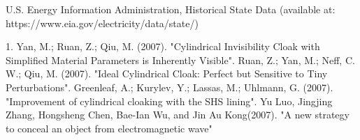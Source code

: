 \documentclass[letterpaper, 12 pt]{article}  %
\begin{document}
\begin{thebibliography}{99}
 U.S. Energy Information Administration, Historical State Data (available at: https://www.eia.gov/electricity/data/state/)

 1.	 Yan, M.; Ruan, Z.; Qiu, M. (2007). "Cylindrical Invisibility Cloak with Simplified Material Parameters is Inherently Visible".
 Ruan, Z.; Yan, M.; Neff, C. W.; Qiu, M. (2007). "Ideal Cylindrical Cloak: Perfect but Sensitive to Tiny Perturbations". 
Greenleaf, A.; Kurylev, Y.; Lassas, M.; Uhlmann, G. (2007). "Improvement of cylindrical cloaking with the SHS lining".
 Yu Luo, Jingjing Zhang, Hongsheng Chen, Bae-Ian Wu, and Jin Au Kong(2007). "A new strategy to conceal an object from electromagnetic wave"


\end{thebibliography}
\end{document}
